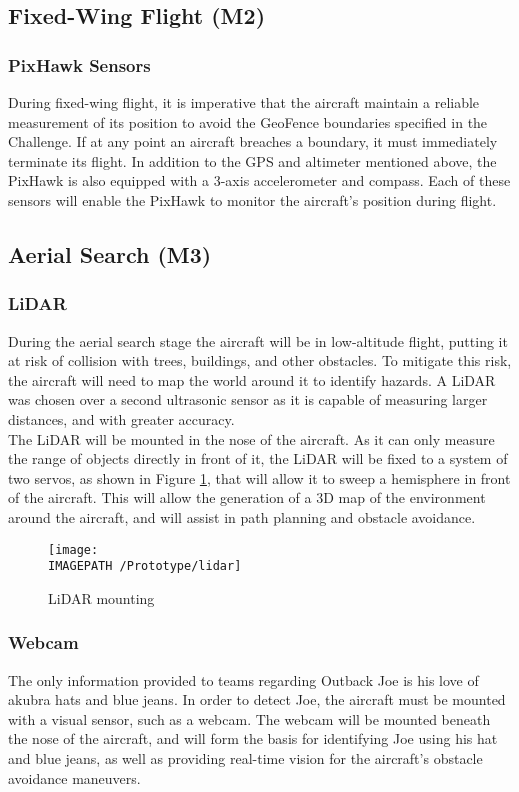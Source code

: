 \subsection{Fixed-Wing Flight (M2)}
\subsubsection*{PixHawk Sensors}
During fixed-wing flight, it is imperative that the aircraft maintain a reliable measurement of its position to avoid the GeoFence boundaries specified in the Challenge. If at any point an aircraft breaches a boundary, it must immediately terminate its flight. In addition to the GPS and altimeter mentioned above, the PixHawk is also equipped with a 3-axis accelerometer and compass. Each of these sensors will enable the PixHawk to monitor the aircraft's position during flight.

\subsection{Aerial Search (M3)}
\subsubsection*{LiDAR}
During the aerial search stage the aircraft will be in low-altitude flight, putting it at risk of collision with trees, buildings, and other obstacles. To mitigate this risk, the aircraft will need to map the world around it to identify hazards. A LiDAR was chosen over a second ultrasonic sensor as it is capable of measuring larger distances, and with greater accuracy.\\

The LiDAR will be mounted in the nose of the aircraft. As it can only measure the range of objects directly in front of it, the LiDAR will be fixed to a system of two servos, as shown in Figure \ref{fig:lidar}, that will allow it to sweep a hemisphere in front of the aircraft. This will allow the generation of a 3D map of the environment around the aircraft, and will assist in path planning and obstacle avoidance.

\begin{figure}[!ht]
	\centering
	\texttt{[image: \\IMAGEPATH /Prototype/lidar]}
	\caption{LiDAR mounting}
	\label{fig:lidar}
\end{figure}

\subsubsection*{Webcam}
The only information provided to teams regarding Outback Joe is his love of akubra hats and blue jeans. In order to detect Joe, the aircraft must be mounted with a visual sensor, such as a webcam. The webcam will be mounted beneath the nose of the aircraft, and will form the basis for identifying Joe using his hat and blue jeans, as well as providing real-time vision for the aircraft's obstacle avoidance maneuvers.

